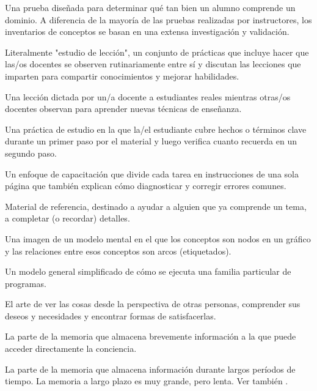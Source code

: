 \begin{description}
 Una prueba diseñada para determinar 
qué tan bien un alumno comprende un dominio. A diferencia de la mayoría de las pruebas realizadas por instructores, 
los inventarios de conceptos se basan en una extensa investigación y validación.

 Literalmente "estudio de lección", un conjunto de prácticas que incluye hacer que las/os docentes se observen rutinariamente entre sí y discutan las lecciones que imparten para compartir conocimientos y mejorar habilidades.

 Una lección dictada por un/a docente a estudiantes reales 
mientras otras/os docentes observan para aprender nuevas técnicas de enseñanza.

 Una práctica de estudio 
en la que la/el estudiante cubre hechos o términos clave durante un primer paso por el material y luego verifica cuanto recuerda en un segundo paso.

 Un enfoque de capacitación que divide 
cada tarea en instrucciones de una sola página que también 
explican cómo diagnosticar y corregir errores comunes.

 Material de referencia, destinado a ayudar a alguien que ya comprende un tema, a completar (o recordar) detalles.

 Una imagen de un modelo mental en el que 
los conceptos son nodos en un gráfico y las relaciones entre esos conceptos son arcos (etiquetados).

 Un modelo general simplificado de cómo se ejecuta una familia particular de programas.



 El arte de ver las cosas desde la perspectiva 
de otras personas, comprender sus deseos y necesidades y encontrar 
formas de satisfacerlas.

 La parte de la memoria que almacena brevemente información a la que puede acceder directamente la conciencia.

 La parte de la memoria que 
almacena información durante largos períodos de tiempo. La memoria a largo plazo es muy grande, 
pero lenta. Ver también .


\end{description}
